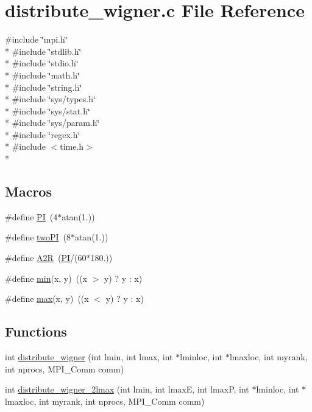 \section{distribute\-\_\-wigner.\-c File Reference}
\label{common_2distribute__wigner_8c}
{\ttfamily \#include \char`\"{}mpi.\-h\char`\"{}}\\*
{\ttfamily \#include \char`\"{}stdlib.\-h\char`\"{}}\\*
{\ttfamily \#include \char`\"{}stdio.\-h\char`\"{}}\\*
{\ttfamily \#include \char`\"{}math.\-h\char`\"{}}\\*
{\ttfamily \#include \char`\"{}string.\-h\char`\"{}}\\*
{\ttfamily \#include \char`\"{}sys/types.\-h\char`\"{}}\\*
{\ttfamily \#include \char`\"{}sys/stat.\-h\char`\"{}}\\*
{\ttfamily \#include \char`\"{}sys/param.\-h\char`\"{}}\\*
{\ttfamily \#include \char`\"{}regex.\-h\char`\"{}}\\*
{\ttfamily \#include $<$time.\-h$>$}\\*
\subsection*{Macros}
\begin{DoxyCompactItemize}
\item 
\#define \hyperlink{common_2distribute__wigner_8c_a598a3330b3c21701223ee0ca14316eca}{P\-I}~(4$\ast$atan(1.))
\item 
\#define \hyperlink{common_2distribute__wigner_8c_a0a3527f8b23535fe43972fbe88c3cc0d}{two\-P\-I}~(8$\ast$atan(1.))
\item 
\#define \hyperlink{common_2distribute__wigner_8c_a7eb5b348f6b35aa19816af220244cebc}{A2\-R}~(\hyperlink{kernels_2distribute__wigner_8c_a598a3330b3c21701223ee0ca14316eca}{P\-I}/(60$\ast$180.))
\item 
\#define \hyperlink{common_2distribute__wigner_8c_abb702d8b501669a23aa0ab3b281b9384}{min}(x, y)~((x $>$ y) ? y \-: x)
\item 
\#define \hyperlink{common_2distribute__wigner_8c_ac39d9cef6a5e030ba8d9e11121054268}{max}(x, y)~((x $<$ y) ? y \-: x)
\end{DoxyCompactItemize}
\subsection*{Functions}
\begin{DoxyCompactItemize}
\item 
int \hyperlink{common_2distribute__wigner_8c_acbe2e94a087052ad894871b4492c16b4}{distribute\-\_\-wigner} (int lmin, int lmax, int $\ast$lminloc, int $\ast$lmaxloc, int myrank, int nprocs, M\-P\-I\-\_\-\-Comm comm)
\item 
int \hyperlink{common_2distribute__wigner_8c_a2d42c6160dc38eee12380cb5a23d7772}{distribute\-\_\-wigner\-\_\-2lmax} (int lmin, int lmax\-E, int lmax\-P, int $\ast$lminloc, int $\ast$lmaxloc, int myrank, int nprocs, M\-P\-I\-\_\-\-Comm comm)
\end{DoxyCompactItemize}


